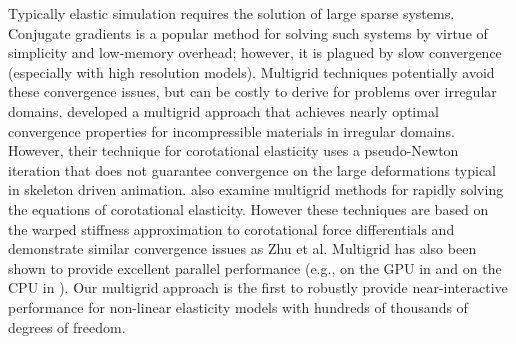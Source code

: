 
Typically elastic simulation requires the solution of large sparse systems. Conjugate gradients is a popular method for solving such systems by virtue of simplicity and low-memory overhead; however, it is plagued by slow convergence (especially with high resolution models). Multigrid techniques potentially avoid these convergence issues, but can be costly to derive for problems over irregular domains. \cite{Zhu:2010:EMM} developed a multigrid approach that achieves nearly optimal convergence properties for incompressible materials in irregular domains. However, their technique for corotational elasticity uses a pseudo-Newton iteration that does not guarantee convergence on the large deformations typical in skeleton driven animation. \cite{Dick:2011:CUDAFEM,Georgii06,Wu04} also examine multigrid methods for rapidly solving the equations of corotational elasticity. However these techniques are based on the warped stiffness approximation to corotational force differentials and demonstrate similar convergence issues as Zhu et al. Multigrid has also been shown to provide excellent parallel performance (e.g., on the GPU in \cite{Dick:2011:CUDAFEM} and on the CPU in \cite{Zhu:2010:EMM}). Our multigrid approach is the first to robustly provide near-interactive performance for non-linear elasticity models with hundreds of thousands of degrees of freedom.
